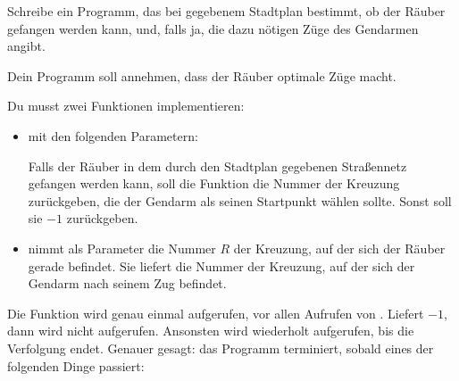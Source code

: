 \documentclass{boi2014-de}
\begin{document}
    \Task
    Schreibe ein Programm, das bei gegebenem Stadtplan bestimmt,
    ob der Räuber gefangen werden kann, und, falls ja, die dazu nötigen Züge des Gendarmen angibt.

    Dein Programm soll annehmen, dass der Räuber optimale Züge macht.

    \Implementation
    Du musst zwei Funktionen implementieren:
    \begin{itemize}
        \item {} mit den folgenden Parametern:
        
        Falls der Räuber in dem durch den Stadtplan gegebenen Straßennetz gefangen werden kann,
        soll die Funktion  die Nummer der Kreuzung zurückgeben, die der Gendarm als seinen Startpunkt wählen sollte. Sonst soll sie $-1$ zurückgeben.

        \item {} 
            nimmt als Parameter die Nummer $R$ der Kreuzung, auf der sich der Räuber gerade befindet.
            Sie liefert die Nummer der Kreuzung, auf der sich der Gendarm nach seinem Zug befindet.
    \end{itemize}

    Die Funktion  wird genau einmal aufgerufen, vor allen Aufrufen von .
    Liefert  $-1$, dann wird   nicht aufgerufen.
    Ansonsten wird  wiederholt aufgerufen, bis die Verfolgung endet.
    Genauer gesagt:  das Programm terminiert, sobald eines der folgenden Dinge passiert:
    
\end{document}
